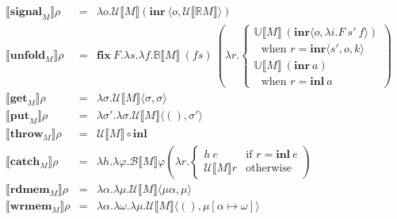 \documentclass{article}[11pt]
\begin{document}
\begin{eqnarray*}
\llbracket{}\mathbf{signal}_M\rrbracket\rho &=& \lambda o . \mathcal{U}\llbracket{}M\rrbracket(\mathbf{inr}~ \langle o,\mathcal{U}\llbracket{}\mathbb{R}M\rrbracket\rangle)\\
\llbracket{}\mathbf{unfold}_M\rrbracket\rho &=& \mathbf{fix}~ F . \lambda s . \lambda f . \mathbb{B}\llbracket{}M\rrbracket~(f s)~ \left(\lambda r . \begin{cases}\mathbb{U}\llbracket{}M\rrbracket~ (\mathbf{inr} \langle{}o,\lambda i . F~ s'~ f\rangle{})\\~~~\text{when } r = \mathbf{inr}\langle{}s',o,k\rangle\\\mathbb{U}\llbracket{}M\rrbracket~ (\mathbf{inr}~ a)\\~~~\text{when } r = \mathbf{inl}~ a\end{cases}\right)\\
\llbracket{}\mathbf{get}_M\rrbracket\rho &=& \lambda \sigma . \mathcal{U}\llbracket{}M\rrbracket\langle\sigma,\sigma\rangle\\
\llbracket{}\mathbf{put}_M\rrbracket\rho &=& \lambda \sigma' . \lambda \sigma . \mathcal{U}\llbracket{}M\rrbracket\langle(),\sigma'\rangle\\
\llbracket{}\mathbf{throw}_M\rrbracket\rho &=& \mathcal{U}\llbracket{}M\rrbracket \circ \mathbf{inl}\\
\llbracket{}\mathbf{catch}_M\rrbracket\rho &=& \lambda h . \lambda \varphi . \mathcal{B}\llbracket{}M\rrbracket\varphi\left(\lambda r . \begin{cases}
                                                                                                                                               h~ e&\text{if }r = \mathbf{inl}~ e\\
                                                                                                                                               \mathcal{U}\llbracket{}M\rrbracket r&\text{otherwise}
                                                                                                                                              \end{cases}\right)\\
\llbracket{}\mathbf{rdmem}_M\rrbracket\rho &=& \lambda \alpha . \lambda \mu . \mathcal{U}\llbracket{}M\rrbracket \langle\mu\alpha,\mu\rangle\\
\llbracket{}\mathbf{wrmem}_M\rrbracket\rho &=& \lambda \alpha . \lambda \omega . \lambda \mu . \mathcal{U}\llbracket{}M\rrbracket \langle(),\mu[\alpha \mapsto \omega]\rangle
\end{eqnarray*}
\end{document}
